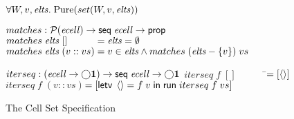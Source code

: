 \begin{figure}
\begin{specification}
$\forall W, v, \mathit{elts}.\; \mathrm{Pure}(set(W,v,\mathit{elts}))$ \nextline[1em]
  
$matches : \mathcal{P}(\mathit{ecell}) \to \mathsf{seq}\;{\mathit{ecell}} \to \mathsf{prop}$ \nextline
$matches\;\mathit{elts}\;[] \qquad\;\;\; = \mathit{elts} = \emptyset$ \nextline
$matches\;\mathit{elts}\;(v :: vs) = v \in \mathit{elts} \land matches\;(\mathit{elts} - \{{v}\})\;vs$\nextline[1em]

$iterseq : (\mathit{ecell} \to \bigcirc{\mathbf{1}}) \to \mathsf{seq}\;{\mathit{ecell}} \to \bigcirc{\mathbf{1}}$ \nextline
$iterseq\; f\; [] \qquad\;\;\;\;$\=$= [\left<\right>]$ \nextline
$iterseq\; f\; (v :: vs)$\>$= [\mathsf{letv}\;\left<\right> = f\;v\;\mathsf{in}\;\mathsf{run}\;iterseq\;f\;vs]$
\end{specification}
\caption{The Cell Set Specification}
\label{cellset-spec}
\end{figure}


